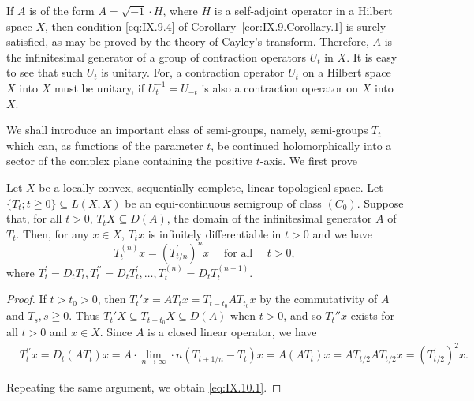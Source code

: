 \begin{remarku} If $A$ is of the form $A = \sqrt{-1} \cdot H$, where $H$ is a self-adjoint operator in a Hilbert space $X$, then condition \eqref{eq:IX.9.4} of Corollary~\ref{cor:IX.9.Corollary.1} is surely satisfied, as may be proved by the theory of Cayley's transform. Therefore, $A$ is the infinitesimal generator of a group of contraction operators $U_t$ in $X$. It is easy to see that such $U_t$ is unitary. For, a contraction operator $U_t$ on a Hilbert space $X$ into $X$ must be unitary, if $U_t^{-1} = U_{-t}$ is also a contraction operator on $X$ into $X$. 
\end{remarku}


\label{sec:IX.10}

We shall introduce an important class of semi-groups, namely, semi-groups $T_{t}$ which can, as functions of the parameter $t$, be continued holomorphically into a sector of the complex plane containing the positive $t$-axis. We first prove 

\begin{lemmau} Let $X$ be a locally convex, sequentially complete, linear topological space. Let $\{T_{t}; t \geqq 0\} \subseteq L(X, X)$ be an equi-continuous semigroup of class $(C_{0})$. Suppose that, for all $t > 0$, $T_{t}X \subseteq D(A)$, the domain of the infinitesimal generator $A$ of $T_{t}$. Then, for any $x \in X$, $T_{t}x$ is infinitely differentiable in $t > 0$ and we have 
\begin{equation}\label{eq:IX.10.1}
T _{t} ^{(n)} x = (T _{t/n} ^{\prime}) ^{n} x \quad \text{ for all } \quad t > 0,
\end{equation}
where $T_{t}^{\prime} = D_{t}T_{t}, T_{t}^{\prime \prime} = D_{t}T_{t}^{\prime}, \ldots, T_{t}^{(n)} = D_{t}T_{t}^{(n-1)}$. 
\end{lemmau}

\begin{proof}
 If $t > t_0 > 0$, then $T_t'x = AT_tx = T_{t-t_0}AT_{t_0}x$ by the commutativity of $A$ and $T_s, s \geqq 0$. Thus $T_t'X \subseteq T_{t-t_0}X \subseteq D(A)$ when $t > 0$, and so $T_t''x$ exists for all $t > 0$ and $x \in X$. Since $A$ is a closed linear operator, we have 
\[ \begin{aligned}
&T _{t} ^{\prime \prime} x= D _{t} (A T _{t}) x = A \cdot \lim\limits _{n \rightarrow \infty} \cdot n (T _{t+1/n} - T _{t}) x = A (A T _{t}) x = A T _{t/2} A T _{t/2} x = (T _{t/2} ^{\prime}) ^{2} x.
\end{aligned}
\]

Repeating the same argument, we obtain \eqref{eq:IX.10.1}. 
\end{proof}

